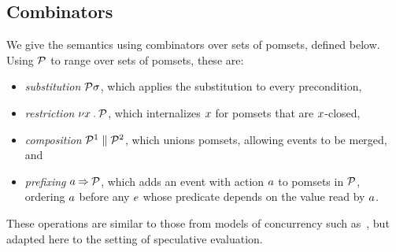 

\subsection{Combinators}

We give the semantics using combinators over sets of pomsets, defined below.
Using $\mathcal{P}$ to range over sets of pomsets, these are:
\begin{itemize}
\item \emph{substitution} $\mathcal{P}\sigma$, which applies the substitution to
  every precondition,
\item \emph{restriction} $\nu x\mathbin.\mathcal{P}$, which internalizes $x$ for
  pomsets that are $x$-closed,
\item \emph{composition} $\mathcal{P}^1\parallel\mathcal{P}^2$, which unions pomsets, allowing events to be merged, and
\item \emph{prefixing} $a\mathbin\Rightarrow\mathcal{P}$, which adds an event with action
  $a$ to pomsets in $\mathcal{P}$, ordering $a$ before any $e$ whose predicate
  depends on the value read by $a$.
\end{itemize}
These operations are similar to those from models of concurrency such
as~\cite{Brookes:1984:TCS:828.833}, but adapted here to the setting of
speculative evaluation.

